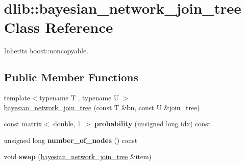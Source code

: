 \hypertarget{classdlib_1_1bayesian__network__join__tree}{
\section{dlib::bayesian\_\-network\_\-join\_\-tree Class Reference}
\label{classdlib_1_1bayesian__network__join__tree}
}


Inherits boost::noncopyable.\subsection*{Public Member Functions}
\begin{DoxyCompactItemize}
\item 
{\footnotesize template$<$typename T , typename U $>$ }\\\hyperlink{classdlib_1_1bayesian__network__join__tree_a7667669c480712d31dcb0ee332491a63}{bayesian\_\-network\_\-join\_\-tree} (const T \&bn, const U \&join\_\-tree)
\item 
\hypertarget{classdlib_1_1bayesian__network__join__tree_a1cf444cf6be8e4288508ee0e815b78d1}{
const matrix$<$ double, 1 $>$ {\bfseries probability} (unsigned long idx) const }
\label{classdlib_1_1bayesian__network__join__tree_a1cf444cf6be8e4288508ee0e815b78d1}

\item 
\hypertarget{classdlib_1_1bayesian__network__join__tree_a744e39b94161de2d16501f40a9361e99}{
unsigned long {\bfseries number\_\-of\_\-nodes} () const }
\label{classdlib_1_1bayesian__network__join__tree_a744e39b94161de2d16501f40a9361e99}

\item 
\hypertarget{classdlib_1_1bayesian__network__join__tree_a2eb88fb81971daa218a300056d5ac305}{
void {\bfseries swap} (\hyperlink{classdlib_1_1bayesian__network__join__tree}{bayesian\_\-network\_\-join\_\-tree} \&item)}
\label{classdlib_1_1bayesian__network__join__tree_a2eb88fb81971daa218a300056d5ac305}

\end{DoxyCompactItemize}


